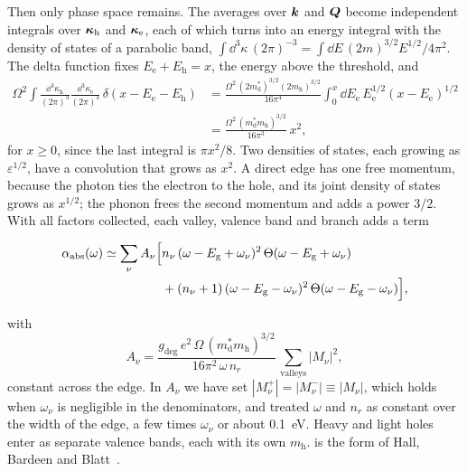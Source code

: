 Then only phase space remains. The averages over $\bm{k}$ and $\bm{Q}$ become independent integrals over $\bm{\kappa}_{\mathrm{h}}$ and $\bm{\kappa}_{\mathrm{e}}$, each of which turns into an energy integral with the density of states of a parabolic band, $\int\dd^3\kappa\,(2\pi)^{-3} = \int\dd E\,(2m)^{3/2}E^{1/2}/4\pi^2$. The delta function fixes $E_{\mathrm{e}} + E_{\mathrm{h}} = x$, the energy above the threshold, and
\begin{equation}
  \begin{aligned}
  \Omega^2\!\int\!\frac{\dd^3\kappa_{\mathrm{h}}}{(2\pi)^3}\frac{\dd^3\kappa_{\mathrm{e}}}{(2\pi)^3}\,\delta(x - E_{\mathrm{e}} - E_{\mathrm{h}})
  &= \frac{\Omega^2\,(2m^*_{\mathrm{d}})^{3/2}(2m_{\mathrm{h}})^{3/2}}{16\pi^4}\int_0^x\dd E_{\mathrm{e}}\,E_{\mathrm{e}}^{1/2}(x - E_{\mathrm{e}})^{1/2}\\
  &= \frac{\Omega^2\,(m^*_{\mathrm{d}}m_{\mathrm{h}})^{3/2}}{16\pi^3}\,x^2 ,
  \end{aligned}
  \label{eq:6.5-joint}
\end{equation}
for $x \ge 0$, since the last integral is $\pi x^2/8$. Two densities of states, each growing as $\varepsilon^{1/2}$, have a convolution that grows as $x^2$. A direct edge has one free momentum, because the photon ties the electron to the hole, and its joint density of states grows as $x^{1/2}$; the phonon frees the second momentum and adds a power $3/2$. With all factors collected, each valley, valence band and branch adds a term
\begin{keyresult}
\begin{equation}
  \begin{aligned}
  \alpha_{\mathrm{abs}}(\omega) \simeq \sum_\nu A_\nu\Bigl[&n_\nu\,(\omega - E_{\mathrm{g}} + \omega_\nu)^2\,\Theta(\omega - E_{\mathrm{g}} + \omega_\nu)\\
  &+ (n_\nu + 1)\,(\omega - E_{\mathrm{g}} - \omega_\nu)^2\,\Theta(\omega - E_{\mathrm{g}} - \omega_\nu)\Bigr] ,
  \end{aligned}
  \label{eq:6.5-edge}
\end{equation}
\end{keyresult}
with
\begin{equation*}
  A_\nu = \frac{g_{\mathrm{deg}}\,e^2\,\Omega\,(m^*_{\mathrm{d}}m_{\mathrm{h}})^{3/2}}{16\pi^2\,\omega\,n_r}\,\sum_{\text{valleys}}|M_\nu|^2 ,
\end{equation*}
constant across the edge. In $A_\nu$ we have set $|M^+_\nu| = |M^-_\nu| \equiv |M_\nu|$, which holds when $\omega_\nu$ is negligible in the denominators, and treated $\omega$ and $n_r$ as constant over the width of the edge, a few times $\omega_\nu$ or about \SI{0.1}{eV}. Heavy and light holes enter as separate valence bands, each with its own $m_{\mathrm{h}}$.  is the form of Hall, Bardeen and Blatt~\cite{hall1954infrared}.

